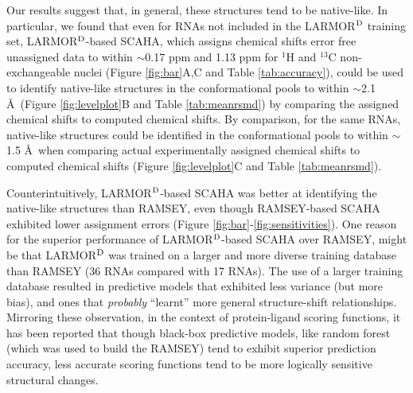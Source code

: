 \documentclass[journal=jcisd8,manuscript=article,layout=onecolumn]{achemso}
\begin{document}
{Our results suggest that, in general, these structures tend to be native-like.  In particular, we found that even for RNAs not included in the LARMOR$^{\rm D}$ training set,  LARMOR$^{\rm D}$-based SCAHA, which assigns chemical shifts error free unassigned data to within $\sim$0.17 ppm and 1.13 ppm for $^{1}$H and $^{13}$C non-exchangeable nuclei (Figure \ref{fig:bar}A,C and Table \ref{tab:accuracy}), could be used to identify native-like structures in the conformational pools to within $\sim$2.1 \AA\ (Figure \ref{fig:levelplot}B and Table \ref{tab:meanrsmd}) by comparing the assigned chemical shifts to computed chemical shifts.  By comparison, for the same RNAs, native-like structures could be identified in the conformational pools to within $\sim$1.5 \AA\ when comparing actual experimentally assigned chemical shifts to computed chemical shifts (Figure \ref{fig:levelplot}C and Table \ref{tab:meanrsmd}). 

Counterintuitively, LARMOR$^{\rm D}$-based SCAHA was better  at identifying the native-like structures than RAMSEY, even though RAMSEY-based SCAHA exhibited lower assignment errors (Figure \ref{fig:bar}-\ref{fig:sensitivities}). One reason for the superior performance of LARMOR$^{\rm D}$-based SCAHA over RAMSEY, might be that LARMOR$^{\rm D}$ was trained on a larger and more diverse training database than RAMSEY (36 RNAs compared with 17 RNAs). The use of a larger training database resulted in predictive models that exhibited less variance (but more bias)\cite{frank2014simple}, and ones that \textit{probably} ``learnt'' more general structure-shift relationships. Mirroring these observation, in the context of protein-ligand scoring functions, it has been reported that though black-box predictive models, like random forest (which was used to build the RAMSEY) tend to exhibit superior prediction accuracy, less accurate scoring functions tend to be more logically sensitive structural changes\cite{gabel2014beware}. 

}
\end{document}
